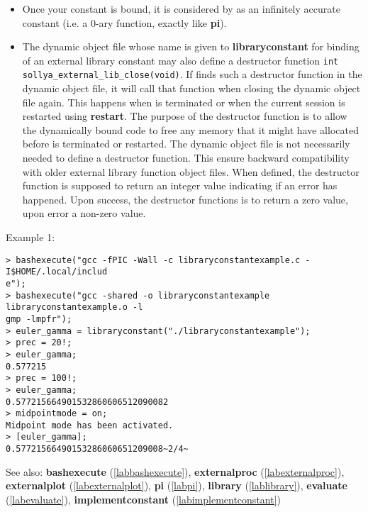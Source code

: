 \begin{itemize}
\item Once your constant is bound, it is considered by \sollya as an infinitely
   accurate constant (i.e. a 0-ary function, exactly like \textbf{pi}).

\item The dynamic object file whose name is given to \textbf{libraryconstant} for binding of an
   external library constant may also define a destructor function \verb|int sollya_external_lib_close(void)|.
   If \sollya finds such a destructor function in the dynamic object file, it will call 
   that function when closing the dynamic object file again. This happens when \sollya
   is terminated or when the current \sollya session is restarted using \textbf{restart}.
   The purpose of the destructor function is to allow the dynamically bound code
   to free any memory that it might have allocated before \sollya is terminated 
   or restarted. 
   The dynamic object file is not necessarily needed to define a destructor
   function. This ensure backward compatibility with older \sollya external 
   library function object files.
   When defined, the destructor function is supposed to return an integer
   value indicating if an error has happened. Upon success, the destructor
   functions is to return a zero value, upon error a non-zero value.
\end{itemize}
\noindent Example 1: 
\begin{center}\begin{minipage}{15cm}\begin{Verbatim}[frame=single]
> bashexecute("gcc -fPIC -Wall -c libraryconstantexample.c -I$HOME/.local/includ
e");
> bashexecute("gcc -shared -o libraryconstantexample libraryconstantexample.o -l
gmp -lmpfr");
> euler_gamma = libraryconstant("./libraryconstantexample");
> prec = 20!;
> euler_gamma;
0.577215
> prec = 100!;
> euler_gamma;
0.577215664901532860606512090082
> midpointmode = on;
Midpoint mode has been activated.
> [euler_gamma];
0.57721566490153286060651209008~2/4~
\end{Verbatim}
\end{minipage}\end{center}
See also: \textbf{bashexecute} (\ref{labbashexecute}), \textbf{externalproc} (\ref{labexternalproc}), \textbf{externalplot} (\ref{labexternalplot}), \textbf{pi} (\ref{labpi}), \textbf{library} (\ref{lablibrary}), \textbf{evaluate} (\ref{labevaluate}), \textbf{implementconstant} (\ref{labimplementconstant})
